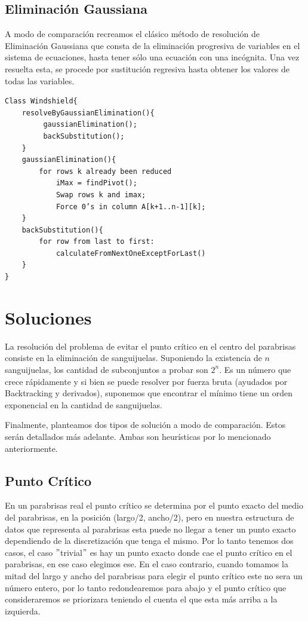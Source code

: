 \newpage

\subsection{Eliminación Gaussiana}
 A modo de comparación recreamos el clásico método de resolución de Eliminación Gaussiana que consta de la eliminación progresiva de variables en el sistema de ecuaciones, hasta tener sólo una ecuación con una incógnita. Una vez resuelta esta, se procede por sustitución regresiva hasta obtener los valores de todas las variables.

\begin{verbatim}
Class Windshield{
    resolveByGaussianElimination(){
         gaussianElimination();
         backSubstitution();
    } 
    gaussianElimination(){
        for rows k already been reduced
            iMax = findPivot();
            Swap rows k and imax;
            Force 0’s in column A[k+1..n-1][k];
    }
    backSubstitution(){
        for row from last to first:
            calculateFromNextOneExceptForLast()
    }
}
\end{verbatim}



\section{Soluciones}

La resolución del problema de evitar el punto crítico en el centro del parabrisas consiste en la eliminación de sanguijuelas. Suponiendo la existencia de $n$ sanguijuelas, los cantidad de subconjuntos a probar son $2^n$. Es un número que crece rápidamente y si bien se puede resolver por fuerza bruta (ayudados por Backtracking y derivados), suponemos que encontrar el mínimo tiene un orden exponencial en la cantidad de sanguijuelas.

Finalmente, planteamos dos tipos de solución a modo de comparación. Estos serán detallados más adelante. Ambas son heurísticas por lo mencionado anteriormente.

\subsection{Punto Crítico}
En un parabrisas real el punto crítico se determina por el punto exacto del medio del parabrisas, en la posición (largo/2, ancho/2), pero en nuestra estructura de datos que representa al parabrisas esta puede no llegar a tener un punto exacto dependiendo de la discretización que tenga el mismo. Por lo tanto tenemos dos casos, el caso $"$trivial$"$ es hay un punto exacto donde cae el punto crítico en el parabrisas, en ese caso elegimos ese. En el caso contrario, cuando tomamos la mitad del largo y ancho del parabrisas para elegir el punto crítico este no sera un número entero, por lo tanto redondearemos para abajo y el punto crítico que consideraremos se priorizara teniendo el cuenta el que esta más arriba a la izquierda.

